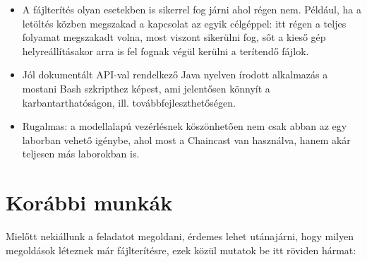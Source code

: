 \begin{itemize}
  \item A fájlterítés olyan esetekben is sikerrel fog járni ahol régen nem. Például, ha a letöltés közben megszakad a kapcsolat az egyik célgéppel: itt régen a teljes folyamat megszakadt volna, most viszont sikerülni fog, sőt a kieső gép helyreállításakor arra is fel fognak végül kerülni a terítendő fájlok.
  \item Jól dokumentált API-val rendelkező Java nyelven írodott alkalmazás a mostani Bash szkripthez képest, ami jelentősen könnyít a karbantarthatóságon, ill. továbbfejleszthetőségen.
  \item Rugalmas: a modellalapú vezérlésnek köszönhetően nem csak abban az egy laborban vehető igénybe, ahol most a Chaincast van használva, hanem akár teljesen más laborokban is.
\end{itemize}

\section{Korábbi munkák}
Mielőtt nekiállunk a feladatot megoldani, érdemes lehet utánajárni, hogy milyen megoldások léteznek már fájlterítésre, ezek közül mutatok be itt röviden hármat:

